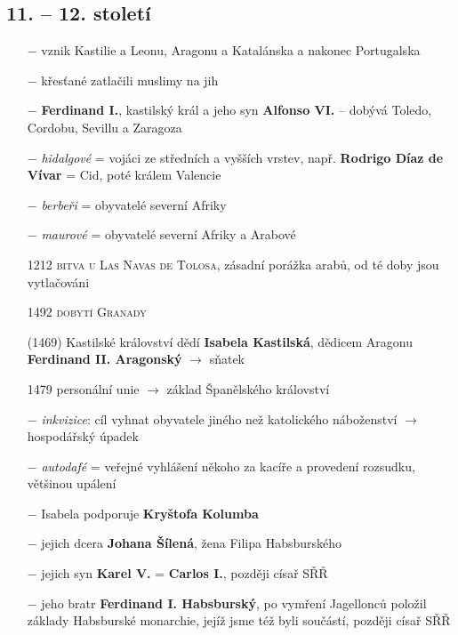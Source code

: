 \documentclass{article}
\begin{document}
\subsection*{11. -- 12. století}
\begin{itemize}
    \vspace{-0.5em}
    \setlength\itemsep{0.15em}
    \item[$-$] vznik Kastilie a Leonu, Aragonu a Katalánska a nakonec Portugalska
    \item[$-$] křesťané zatlačili muslimy na jih
    \item[$-$] \textbf{Ferdinand I.}, kastilský král a jeho syn \textbf{Alfonso VI.} -- dobývá Toledo, Cordobu, Sevillu a Zaragoza
    \item[$-$] \textit{hidalgové} = vojáci ze středních a vyšších vrstev, např. \textbf{Rodrigo Díaz de Vívar} = Cid, poté králem Valencie
    \item[$-$] \textit{berbeři} = obyvatelé severní Afriky
    \item[$-$] \textit{maurové} = obyvatelé severní Afriky a Arabové
    \item[1212] \textsc{bitva u Las Navas de Tolosa}, zásadní porážka arabů, od té doby jsou vytlačováni
    \item[1492] \textsc{dobytí Granady}
    \item[(1469)] Kastilské království dědí \textbf{Isabela Kastilská}, dědicem Aragonu \textbf{Ferdinand II. Aragonský} $\rightarrow$ sňatek
    \item[1479] personální unie $\rightarrow$ základ Španělského království
    \item[$-$] \textit{inkvizice}: cíl vyhnat obyvatele jiného než katolického náboženství $\rightarrow$ hospodářský úpadek
    \item[$-$] \textit{autodafé} = veřejné vyhlášení někoho za kacíře a provedení rozsudku, většinou upálení
    \item[$-$] Isabela podporuje \textbf{Kryštofa Kolumba}
    \item[$-$] jejich dcera \textbf{Johana Šílená}, žena Filipa Habsburského
    \item[$-$] jejich syn \textbf{Karel V.} = \textbf{Carlos I.}, později císař SŘŘ
    \item[$-$] jeho bratr \textbf{Ferdinand I. Habsburský}, po vymření Jagellonců položil základy Habsburské monarchie, jejíž jsme též byli součástí, později císař SŘŘ
\end{itemize}
\end{document}
